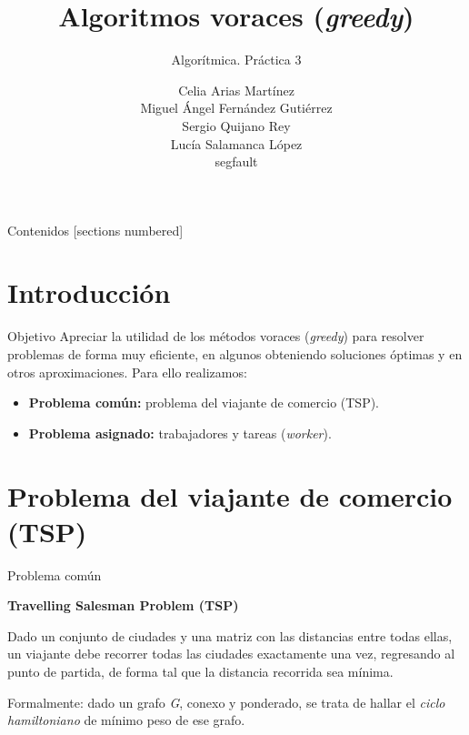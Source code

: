 \documentclass[10pt, xcolor=table]{beamer}
\title{Algoritmos voraces (\emph{greedy})}
\subtitle{Algorítmica. \alert{Práctica 3}}
\date{}
\author{Celia Arias Martínez\\Miguel Ángel Fernández Gutiérrez\\Sergio Quijano Rey\\Lucía Salamanca López\\[4pt]\footnotesize{segfault}}
\begin{document}
\maketitle

\begin{frame}{Contenidos}
	[sections numbered]
	\tableofcontents[]
\end{frame}


\section{Introducción}

\begin{frame}{Objetivo}
Apreciar la utilidad de los métodos voraces (\textit{greedy}) para resolver problemas de forma muy eficiente, en algunos obteniendo soluciones óptimas y en otros aproximaciones. Para ello realizamos:
\begin{itemize}
	\item \textbf{Problema común:} problema del viajante de comercio (TSP).
	\item \textbf{Problema asignado:} trabajadores y tareas (\emph{worker}).
\end{itemize}

\end{frame}

\section{Problema del viajante de comercio (TSP)}

\begin{frame}{Problema común}
\begin{center}
\textbf{\large{Travelling Salesman Problem (TSP)}}
\end{center}
Dado un conjunto de ciudades y una matriz con las distancias entre todas ellas, un viajante debe recorrer todas las ciudades exactamente una vez, regresando al punto de partida, de forma tal que la distancia recorrida sea mínima. 

Formalmente: dado un grafo \textit{G}, conexo y ponderado, se trata de hallar el \textit{ciclo hamiltoniano} de mínimo peso de ese grafo.
\end{frame}
\end{document}
